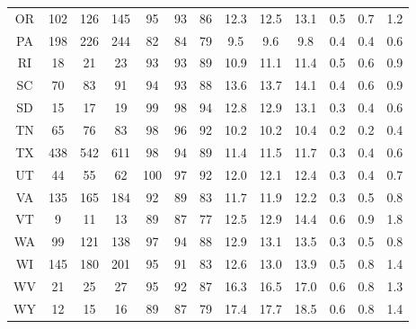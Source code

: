 \begin{table}
\begin{tabular}{ccccccccccccc}
   OR &   102 &   126 &   145 &   95 &   93 &   86 & 12.3 & 12.5 & 13.1 & 0.5 & 0.7 & 1.2 \\
   PA &   198 &   226 &   244 &   82 &   84 &   79 &  9.5 &  9.6 &  9.8 & 0.4 & 0.4 & 0.6 \\
   RI &    18 &    21 &    23 &   93 &   93 &   89 & 10.9 & 11.1 & 11.4 & 0.5 & 0.6 & 0.9 \\
   SC &    70 &    83 &    91 &   94 &   93 &   88 & 13.6 & 13.7 & 14.1 & 0.4 & 0.6 & 0.9 \\
   SD &    15 &    17 &    19 &   99 &   98 &   94 & 12.8 & 12.9 & 13.1 & 0.3 & 0.4 & 0.6 \\
   TN &    65 &    76 &    83 &   98 &   96 &   92 & 10.2 & 10.2 & 10.4 & 0.2 & 0.2 & 0.4 \\
   TX &   438 &   542 &   611 &   98 &   94 &   89 & 11.4 & 11.5 & 11.7 & 0.3 & 0.4 & 0.6 \\
   UT &    44 &    55 &    62 &  100 &   97 &   92 & 12.0 & 12.1 & 12.4 & 0.3 & 0.4 & 0.7 \\
   VA &   135 &   165 &   184 &   92 &   89 &   83 & 11.7 & 11.9 & 12.2 & 0.3 & 0.5 & 0.8 \\
   VT &     9 &    11 &    13 &   89 &   87 &   77 & 12.5 & 12.9 & 14.4 & 0.6 & 0.9 & 1.8 \\
   WA &    99 &   121 &   138 &   97 &   94 &   88 & 12.9 & 13.1 & 13.5 & 0.3 & 0.5 & 0.8 \\
   WI &   145 &   180 &   201 &   95 &   91 &   83 & 12.6 & 13.0 & 13.9 & 0.5 & 0.8 & 1.4 \\
   WV &    21 &    25 &    27 &   95 &   92 &   87 & 16.3 & 16.5 & 17.0 & 0.6 & 0.8 & 1.3 \\
   WY &    12 &    15 &    16 &   89 &   87 &   79 & 17.4 & 17.7 & 18.5 & 0.6 & 0.8 & 1.4 \\
\bottomrule
\end{tabular}
\end{table}
